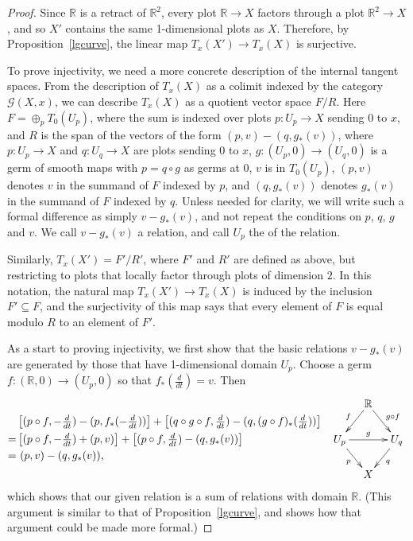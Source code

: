 \documentclass[12pt]{amsart}
\newcommand{\dfn}[1]{\textbf{\boldmath{#1}}}
\theoremstyle{remark}
\newcommand{\ra}{\to}
\newcommand{\cG}{{\mathcal{G}}}
\newcommand{\ddt}{{\textstyle\frac{d}{dt}}}
\def \R{\mathbb{R}}
\begin{document}
\begin{proof}
Since $\R$ is a retract of $\R^2$,
every plot $\R \to X$ factors through a plot $\R^2 \to X$,
and so $X'$ contains the same 1-dimensional plots as $X$.
Therefore, by Proposition~\ref{lgcurve}, the linear map $T_x(X') \ra T_x(X)$ is surjective.

To prove injectivity, we need a more concrete description of the internal tangent
spaces. From the description of $T_x(X)$ as a colimit indexed by the
category $\cG(X,x)$, we can describe $T_x(X)$ as a quotient vector space $F/R$.
Here $F = \oplus_p T_0(U_p)$, where the sum is indexed over plots $p : U_p \to X$
sending $0$ to $x$,
and $R$ is the span of the vectors of the form $(p,v) - (q, g_*(v))$,
where $p : U_p \to X$ and $q : U_q \to X$ are plots sending $0$ to $x$,
$g : (U_p,0) \to (U_q,0)$ is a germ of smooth maps with $p = q \circ g$ as germs at $0$,
$v$ is in $T_0(U_p)$,
$(p,v)$ denotes $v$ in the summand of $F$ indexed by $p$,
and $(q, g_*(v))$ denotes $g_*(v)$ in the summand of $F$ indexed by $q$.
Unless needed for clarity, we will write such a formal difference as simply $v - g_*(v)$,
and not repeat the conditions on $p$, $q$, $g$ and $v$.
We call $v - g_*(v)$ a \dfn{basic} relation, and call $U_p$ the \dfn{domain} of the relation.
%
%

Similarly, $T_x(X') = F'/R'$, where $F'$ and $R'$ are defined as above,
but restricting to plots that locally factor through plots of dimension $2$.
In this notation, the natural map $T_x(X') \to T_x(X)$ is induced
by the inclusion $F' \subseteq F$, and the surjectivity of this map
says that every element of $F$ is equal modulo $R$ to an element of $F'$.

As a start to proving injectivity, we first show that the basic relations
$v - g_*(v)$ are generated by those that have 1-dimensional domain $U_p$.
Choose a germ $f : (\R,0) \to (U_p,0)$ so that $f_*(\ddt) = v$.
Then
\[
\begin{aligned}
  & \left[ (p \circ f, -\ddt) - (p, f_*(-\ddt)) \right] + \left[ (q \circ g \circ f, \ddt) - (q, (g \circ f)_*(\ddt)) \right ] \\
 =& \left[ (p \circ f, -\ddt) + (p, v)          \right] + \left[ (p \circ f, \ddt)  - (q, g_*(v))        \right ] \\
 =&\ (p, v) - (q, g_*(v)) ,
\end{aligned}
\quad\!
\vcenter{
\xymatrix@C-14pt@R-6pt{        &  \R \ar[ld]_f \ar[rd]^{g \circ f} & \\
           U_p \ar[dr]_p \ar[rr]^g     &&  U_q \ar[dl]^q  \\
                         &   X & }
}
\]
which shows that our given relation is a sum of relations with
domain $\R$. %
(This argument is similar to that of Proposition~\ref{lgcurve}, and shows
how that argument could be made more formal.)


\end{proof}
\end{document}
